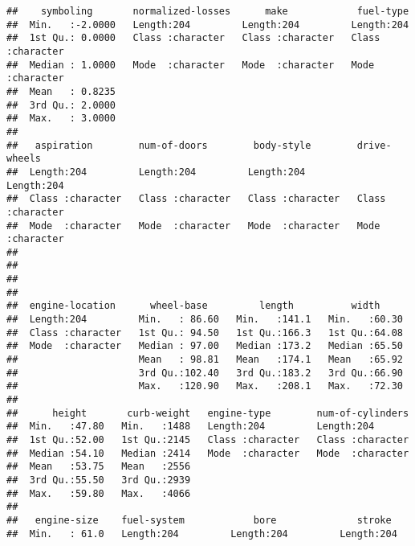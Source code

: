\documentclass[
]{article}
\begin{document}
\begin{verbatim}
##    symboling       normalized-losses      make            fuel-type        
##  Min.   :-2.0000   Length:204         Length:204         Length:204        
##  1st Qu.: 0.0000   Class :character   Class :character   Class :character  
##  Median : 1.0000   Mode  :character   Mode  :character   Mode  :character  
##  Mean   : 0.8235                                                           
##  3rd Qu.: 2.0000                                                           
##  Max.   : 3.0000                                                           
##                                                                            
##   aspiration        num-of-doors        body-style        drive-wheels      
##  Length:204         Length:204         Length:204         Length:204        
##  Class :character   Class :character   Class :character   Class :character  
##  Mode  :character   Mode  :character   Mode  :character   Mode  :character  
##                                                                             
##                                                                             
##                                                                             
##                                                                             
##  engine-location      wheel-base         length          width      
##  Length:204         Min.   : 86.60   Min.   :141.1   Min.   :60.30  
##  Class :character   1st Qu.: 94.50   1st Qu.:166.3   1st Qu.:64.08  
##  Mode  :character   Median : 97.00   Median :173.2   Median :65.50  
##                     Mean   : 98.81   Mean   :174.1   Mean   :65.92  
##                     3rd Qu.:102.40   3rd Qu.:183.2   3rd Qu.:66.90  
##                     Max.   :120.90   Max.   :208.1   Max.   :72.30  
##                                                                     
##      height       curb-weight   engine-type        num-of-cylinders  
##  Min.   :47.80   Min.   :1488   Length:204         Length:204        
##  1st Qu.:52.00   1st Qu.:2145   Class :character   Class :character  
##  Median :54.10   Median :2414   Mode  :character   Mode  :character  
##  Mean   :53.75   Mean   :2556                                        
##  3rd Qu.:55.50   3rd Qu.:2939                                        
##  Max.   :59.80   Max.   :4066                                        
##                                                                      
##   engine-size    fuel-system            bore              stroke         
##  Min.   : 61.0   Length:204         Length:204         Length:204        

\end{verbatim}
\end{document}
